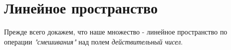 \section*{Линейное пространство}
Прежде всего докажем, что наше множество - линейное пространство по операции \textit{"смешивания"} над полем \textit{действительный чисел}.



